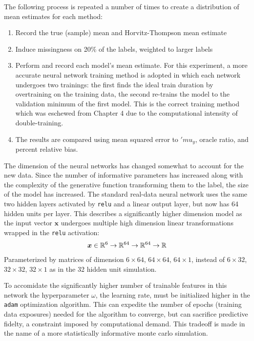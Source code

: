 \documentclass[12pt,twoside]{reedthesis}
\providecommand{\tightlist}{%
  \setlength{\itemsep}{0pt}\setlength{\parskip}{0pt}}
\begin{document}
The following process is repeated a number of times to create a
distribution of mean estimates for each method:
\begin{enumerate}
\def\labelenumi{\arabic{enumi}.}
\tightlist
\item
  Record the true (sample) mean and Horvitz-Thompson mean estimate
\item
  Induce missingness on 20\% of the labels, weighted to larger labels
\item
  Perform and record each model's mean estimate. For this experiment, a
  more accurate neural network training method is adopted in which each
  network undergoes two trainings: the first finds the ideal train
  duration by overtraining on the training data, the second re-trains
  the model to the validation minimum of the first model. This is the
  correct training method which was eschewed from Chapter 4 due to the
  computational intensity of double-training.
\item
  The results are compared using mean squared error to \('mu_y\), oracle
  ratio, and percent relative bias.
\end{enumerate}
The dimension of the neural networks has changed somewhat to account for
the new data. Since the number of informative parameters has increased
along with the complexity of the generative function transforming them
to the label, the size of the model has increased. The standard
real-data neural network uses the same two hidden layers activated by
\texttt{relu} and a linear output layer, but now has 64 hidden units per
layer. This describes a significantly higher dimension model as the
input vector \(\boldsymbol{x}\) undergoes multiple high dimension linear
transformations wrapped in the \texttt{relu} activation: \[
\boldsymbol{x} \in \mathbb{R}^6 \\
\rightarrow \mathbb{R}^{64} \\
\rightarrow \mathbb{R}^{64} \rightarrow \mathbb{R}
\] Parameterized by matrices of dimension \(6 \times 64\),
\(64 \times 64\), \(64 \times 1\), instead of \(6 \times 32\),
\(32 \times 32\), \(32 \times 1\) as in the 32 hidden unit simulation.

To accomidate the significantly higher number of trainable features in
this network the hyperparameter \(\omega\), the learning rate, must be
initialized higher in the \texttt{adam} optimization algorithm. This can
expedite the number of epochs (training data exposures) needed for the
algorithm to converge, but can sacrifice predictive fidelty, a
constraint imposed by computational demand. This tradeoff is made in the
name of a more statistically informative monte carlo simulation.
\end{document}
